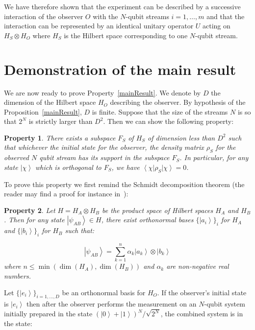 \documentclass[11pt,amsmath,amssymb,latexsym,a4paper]{article}
\newtheorem{myProperty}{Property}
\newcommand{\ket}[1]{\left|{#1}\right>}
\newcommand{\bra}[1]{\left<{#1}\right|}
\begin{document}
We have therefore shown that the experiment can be described by a successive interaction of the observer $O$ with the $N$-qubit streams $i=1,\ldots,m$ and that the interaction can be represented by an identical unitary operator $U$ acting on $H_S\otimes H_O$ where $H_S$ is the Hilbert space corresponding to one $N$-qubit stream.




\section{Demonstration of the main result}

We are now ready to prove Property~\ref{mainResult}. We denote by $D$ the dimension of the Hilbert space $H_O$ describing the observer. By hypothesis of the Proposition~\ref{mainResult}, $D$ is finite. Suppose that the size of the streams $N$ is so that $2^N$ is strictly larger than $D^2$. Then we can show the following property:


\begin{myProperty} There exists a subspace $F_S$ of $H_S$ of dimension less than $D^2$ such that whichever the initial state for the observer, the density matrix $\rho_S$ for the observed $N$ qubit stream has its support in the subspace $F_S$. In particular, for any state $\ket{\chi}$ which is orthogonal to $F_S$, we have $\bra{\chi}\rho_S\ket{\chi} = 0$. 
\end{myProperty}


To prove this property we first remind the Schmidt decomposition theorem (the reader may find a proof for instance in~\cite{Bergou}):

\begin{myProperty} Let $H=H_A\otimes H_B$ be the product space of Hilbert spaces $H_A$ and $H_B$. Then for any state $\ket{\psi_{AB}}\in H$, there exist orthonormal bases $\{\ket{a_i}\}_i$ for $H_A$ and $\{\ket{b_i}\}_i$ for $H_B$ such that:

\begin{equation}
\ket{\psi_{AB}} = \sum_{k=1}^n \alpha_k \ket{a_k}\otimes\ket{b_k}
\end{equation}
where $n \leq \min (\dim(H_A),\dim(H_B))$ and $\alpha_k$ are non-negative real numbers.
\end{myProperty}

Let $\{\ket{e_i}\}_{i=1,\ldots,D}$ be an orthonormal basis for $H_O$. If the observer's initial state is $\ket{e_i}$ then after the observer performs the measurement on an $N$-qubit system initially prepared in the state $(\ket{0}+\ket{1})^N/\sqrt{2^N}$, the combined system is in the state:
\end{document}
